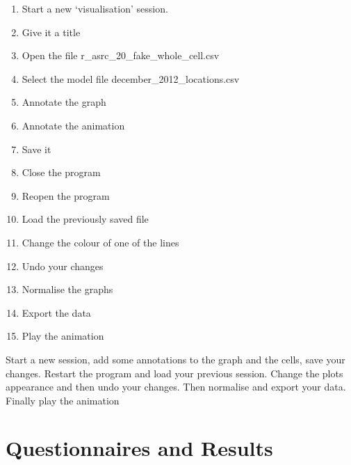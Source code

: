 \begin{enumerate}
\item Start a new `visualisation' session.
\item Give it a title
\item Open the file r\_asrc\_20\_fake\_whole\_cell.csv
\item Select the model file december\_2012\_locations.csv
\item Annotate the graph
\item Annotate the animation
\item Save it
\item Close the program
\item Reopen the program
\item Load the previously saved file
\item Change the colour of one of the lines
\item Undo your changes
\item Normalise the graphs
\item Export the data
\item Play the animation
\end{enumerate}

Start a new session, add some annotations to the graph and the cells, save your changes.  Restart the program and load your previous session.  Change the plots appearance and then undo your changes.  Then normalise and export your data.  Finally play the animation

\clearpage

\section{Questionnaires and Results}
\label{sec:qs}

